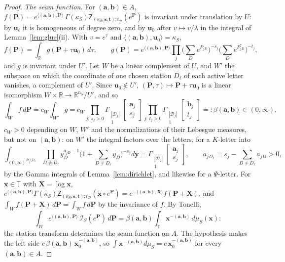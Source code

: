 \documentclass[11pt]{article}
\theoremstyle{plain}
\theoremstyle{definition}
\theoremstyle{remark}
\newcommand{\cD}{\mathcal D}
\newcommand{\cI}{\mathcal I}
\newcommand{\R}{\mathbb R}
\newcommand{\TT}{\mathbb T}
\newcommand{\bx}{\mathbf x}
\newcommand{\sZ}{\mathsf Z}
\newcommand{\Gst}[4]{\Gamma_{\substack{#1\\#2}}\!\begin{bmatrix}#3\\#4\end{bmatrix}}
\begin{document}
\begin{proof}
\emph{The seam function.} For $(\mathbf a,\mathbf b)\in A$, $f(\mathbf P)=e^{\langle(\mathbf a,\mathbf b),\mathbf P\rangle}\,\Gamma(\kappa_S)\sZ_{(\kappa_S,\mathbf s,\mathbf t);t_{\cD}}(e^{\mathbf P})$ is invariant under translation by $U$: by $\mathbf u_\ell$ it is homogeneous of degree zero, and by $\mathbf u_0$ after $v\mapsto v/\lambda$ in the integral of Lemma~\ref{lem:glue}(ii). With $v=e^\tau$ and $\langle(\mathbf a,\mathbf b),\mathbf u_0\rangle=\kappa_S$,
\[
f(\mathbf P)=\int_\R g(\mathbf P+\tau\mathbf u_0)\,d\tau,\qquad g(\mathbf P)=e^{\langle(\mathbf a,\mathbf b),\mathbf P\rangle}\prod_j\Big(\sum_De^{P_{jD}}\Big)^{-s_j}\Big(\sum_De^{P^\ast_{jD}}\Big)^{-t_j},
\]
and $g$ is invariant under $U'$. Let $W$ be a linear complement of $U$, and $W'$ the subspace on which the coordinate of one chosen station $D_\ell$ of each active letter vanishes, a complement of $U'$. Since $\mathbf u_0\notin U'$, $(\mathbf P,\tau)\mapsto\mathbf P+\tau\mathbf u_0$ is a linear isomorphism $W\times\R\to\R^{n_S}/U'$, and so
\[
\int_Wf\,d\mathbf P=c_W\int_{W'}g=c_W\prod_{j:\,s_j>0}\Gst{|\cD_j|}1{\mathbf a_j}{s_j}\prod_{j:\,t_j>0}\Gst{|\cD_j|}1{\mathbf b_j}{t_j}=:\beta(\mathbf a,\mathbf b)\in(0,\infty),
\]
$c_W>0$ depending on $W$, $W'$ and the normalizations of their Lebesgue measures, but not on $(\mathbf a,\mathbf b)$: on $W'$ the integral factors over the letters, for a $K$-letter into
\[
\int_{(0,\infty)^{\cD_j\setminus D_\ell}}\prod_{D\neq D_\ell}y_D^{a_{jD}-1}\Big(1+\sum_{D\neq D_\ell}y_D\Big)^{-s_j}d\mathbf y=\Gst{|\cD_j|}1{\mathbf a_j}{s_j},\qquad a_{jD_\ell}=s_j-\sum_{D\neq D_\ell}a_{jD}>0,
\]
by the Gamma integrals of Lemma~\ref{lem:dirichlet}, and likewise for a $\Psi$-letter. For $\bx\in\TT$ with $\mathbf X=\log\bx$, $e^{\langle(\mathbf a,\mathbf b),\mathbf P\rangle}\Gamma(\kappa_S)\sZ_{(\kappa_S,\mathbf s,\mathbf t);t_{\cD}}(\bx\circ e^{\mathbf P})=e^{-\langle(\mathbf a,\mathbf b),\mathbf X\rangle}f(\mathbf P+\mathbf X)$, and $\int_Wf(\mathbf P+\mathbf X)\,d\mathbf P=\int_Wf\,d\mathbf P$ by the invariance of $f$. By Tonelli,
\[
\int_We^{\langle(\mathbf a,\mathbf b),\mathbf P\rangle}\,\cI_S(e^{\mathbf P})\,d\mathbf P=\beta(\mathbf a,\mathbf b)\int_{\TT}\bx^{-(\mathbf a,\mathbf b)}\,d\mu_S(\bx):
\]
the station transform determines the seam function on $A$. The hypothesis makes the left side $c\,\beta(\mathbf a,\mathbf b)\,\bx_0^{-(\mathbf a,\mathbf b)}$, so $\int\bx^{-(\mathbf a,\mathbf b)}d\mu_S=c\,\bx_0^{-(\mathbf a,\mathbf b)}$ for every $(\mathbf a,\mathbf b)\in A$.


\end{proof}
\end{document}
